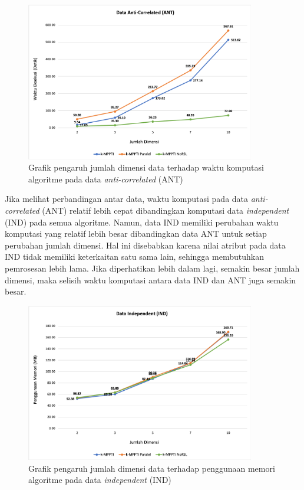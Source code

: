 \begin{figure}[H]
	\centering
	\includegraphics[width=10cm]{assets/img/bab5/grafik-ant-dim-time.png}
	\caption{Grafik pengaruh jumlah dimensi data terhadap waktu komputasi algoritme pada data \textit{anti-correlated} (ANT)}
	\label{fig:grafik-ant-dim-time}
\end{figure}

Jika melihat perbandingan antar data, waktu komputasi pada data \textit{anti-correlated} (ANT) relatif lebih cepat dibandingkan komputasi data \textit{independent} (IND) pada semua algoritme. Namun, data IND memiliki perubahan waktu komputasi yang relatif lebih besar dibandingkan data ANT untuk setiap perubahan jumlah dimensi. Hal ini disebabkan karena nilai atribut pada data IND tidak memiliki keterkaitan satu sama lain, sehingga membutuhkan pemrosesan lebih lama. Jika diperhatikan lebih dalam lagi, semakin besar jumlah dimensi, maka selisih waktu komputasi antara data IND dan ANT juga semakin besar.

\begin{figure}[H]
	\centering
	\includegraphics[width=10cm]{assets/img/bab5/grafik-ind-dim-mem.png}
	\caption{Grafik pengaruh jumlah dimensi data terhadap penggunaan memori algoritme pada data \textit{independent} (IND)}
	\label{fig:grafik-ind-dim-mem}
\end{figure}

